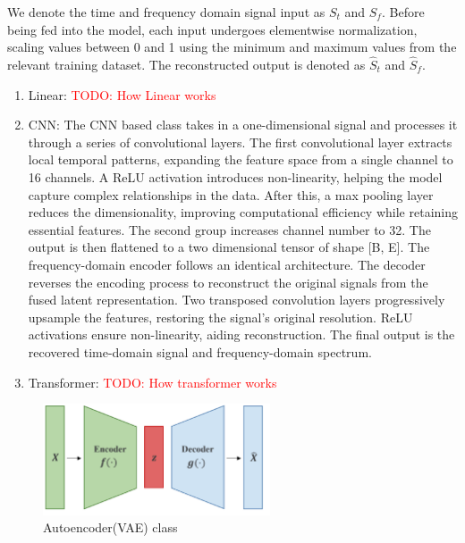 \documentclass[12pt]{article}
\newcommand{\todo}[1]{\textcolor{red}{TODO: #1}}
\begin{document}
We denote the time and frequency domain signal input as $S_{t}$ and $S_f$. Before being fed into the model, each input undergoes elementwise normalization, scaling values between 0 and 1 using the minimum and maximum values from the relevant training dataset. The reconstructed output is denoted as $\hat{S}_{t}$ and $\hat{S}_{f}$.

\begin{enumerate}
    \item Linear: \todo{How Linear works}
    \item CNN: The CNN based class takes in a one-dimensional signal and processes it through a series of convolutional layers. The first convolutional layer extracts local temporal patterns, expanding the feature space from a single channel to 16 channels. A ReLU activation introduces non-linearity, helping the model capture complex relationships in the data. After this, a max pooling layer reduces the dimensionality, improving computational efficiency while retaining essential features. The second group increases channel number to 32. The output is then flattened to a two dimensional tensor of shape [B, E]. The frequency-domain encoder follows an identical architecture. The decoder reverses the encoding process to reconstruct the original signals from the fused latent representation. Two transposed convolution layers progressively upsample the features, restoring the signal's original resolution. ReLU activations ensure non-linearity, aiding reconstruction. The final output is the recovered time-domain signal and frequency-domain spectrum.
    \item Transformer: \todo{How transformer works}
\end{enumerate}

\begin{figure}[htbp]
    \centering
    \includegraphics[width=0.6\textwidth]{ae-class.png}
    \caption{Autoencoder(VAE) class}
    \label{fig:ae-class}
\end{figure}
\end{document}
